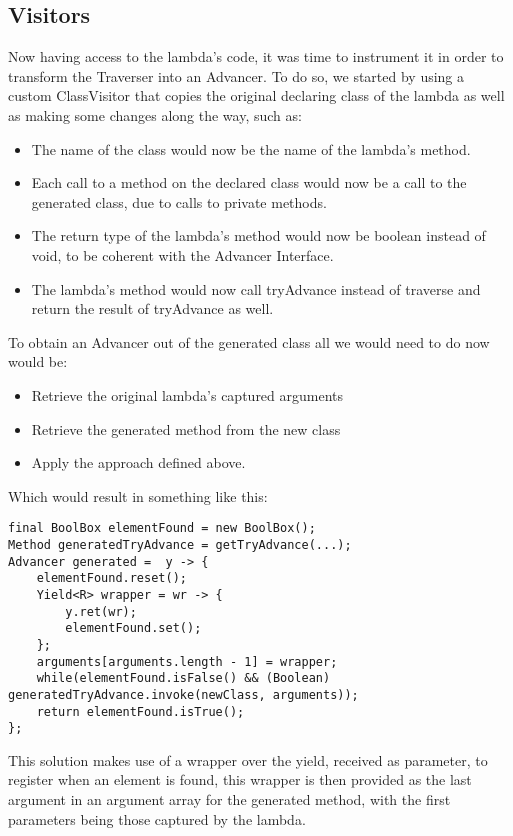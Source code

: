 \subsection{Visitors}

Now having access to the lambda's code, it was time to instrument it in order to transform the Traverser into an Advancer. To do so, we started by using a custom ClassVisitor that copies the original declaring class of the lambda as well as making some changes along the way, such as:
\begin{itemize}
\item The name of the class would now be the name of the lambda's method.
\item Each call to a method on the declared class would now be a call to the generated class, due to calls to private methods.
\item The return type of the lambda's method would now be boolean instead of void, to be coherent with the Advancer Interface.
\item The lambda's method would now call tryAdvance instead of traverse and return the result of tryAdvance as well.
\end{itemize}

To obtain an Advancer out of the generated class all we would need to do now would be:
\begin{itemize}
\item Retrieve the original lambda's captured arguments
\item Retrieve the generated method from the new class
\item Apply the approach defined above.
\end{itemize}

Which would result in something like this:
\begin{lstlisting}[caption={Generated Advancer},captionpos=b, label={lst:advanger-gen1}]
final BoolBox elementFound = new BoolBox();
Method generatedTryAdvance = getTryAdvance(...);
Advancer generated =  y -> {
	elementFound.reset();
	Yield<R> wrapper = wr -> {
		y.ret(wr);
		elementFound.set();
	};
	arguments[arguments.length - 1] = wrapper;
	while(elementFound.isFalse() && (Boolean) generatedTryAdvance.invoke(newClass, arguments));
	return elementFound.isTrue();
};
\end{lstlisting}

This solution makes use of a wrapper over the yield, received as parameter, to register when an element is found, this wrapper is then provided as the last argument in an argument array for the generated method, with the first parameters being those captured by the lambda. 

